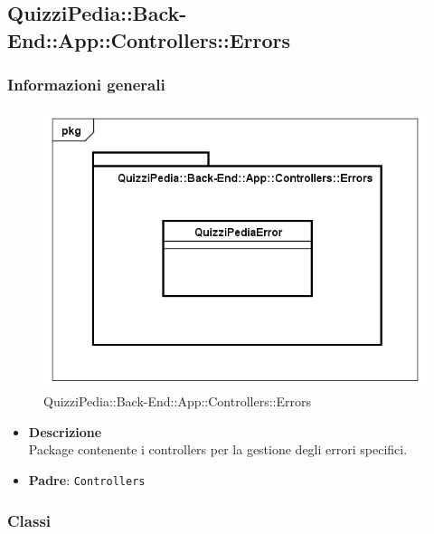 \subsection{QuizziPedia::Back-End::App::Controllers::Errors}
\subsubsection{Informazioni generali}
\label{QuizziPedia::Back-End::App::Controllers::Errors}
\begin{figure}
	\centering
	\includegraphics[scale=0.45]{UML/Package/QuizziPedia_Back-End_App_Controllers_Errors.png}
	\caption{QuizziPedia::Back-End::App::Controllers::Errors}
\end{figure}
	\begin{itemize}
		\item \textbf{Descrizione} \\
		Package contenente i controllers per la gestione degli errori specifici.
		\item \textbf{Padre}: \texttt{Controllers}
	\end{itemize}
\subsubsection{Classi}
